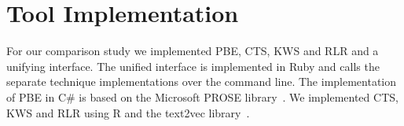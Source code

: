 \documentclass[\myrootdir/main.tex]{subfiles}
\begin{document}
\section{Tool Implementation}
For our comparison study we implemented PBE, CTS, KWS and RLR and a unifying interface.
The unified interface is implemented in Ruby and calls the separate technique implementations over the command line.
The implementation of PBE in C\# is based on the Microsoft PROSE library~\cite{prose2019webpage}.
We implemented CTS, KWS and RLR using R and the text2vec library~\cite{text2vec2019webpage}.
\end{document}
